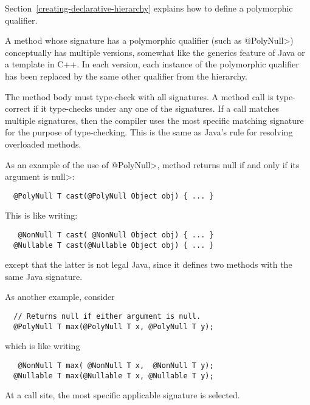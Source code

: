 Section~\ref{creating-declarative-hierarchy} explains how to define a
polymorphic qualifier.



A method whose signature has a polymorphic qualifier (such as \<@PolyNull>) conceptually has multiple
versions, somewhat like the generics feature of Java or a template in C++.
In each version, each instance of the polymorphic qualifier has been
replaced by the same other qualifier from the hierarchy.

The method body must type-check with all signatures.  A method call is
type-correct if it type-checks under any one of the signatures.  If a call
matches multiple signatures, then the compiler uses the most specific
matching signature for the purpose of type-checking.  This is the same as
Java's rule for resolving overloaded methods.


As an example of the use of \<@PolyNull>, method
returns null if and only if its argument is \<null>:

\begin{Verbatim}
  @PolyNull T cast(@PolyNull Object obj) { ... }
\end{Verbatim}

\noindent
This is like writing:

\begin{Verbatim}
   @NonNull T cast( @NonNull Object obj) { ... }
  @Nullable T cast(@Nullable Object obj) { ... }
\end{Verbatim}

\noindent
except that the latter is not legal Java, since it defines two
methods with the same Java signature.


As another example, consider

\begin{Verbatim}
  // Returns null if either argument is null.
  @PolyNull T max(@PolyNull T x, @PolyNull T y);
\end{Verbatim}

\noindent
which is like writing

\begin{Verbatim}
   @NonNull T max( @NonNull T x,  @NonNull T y);
  @Nullable T max(@Nullable T x, @Nullable T y);
\end{Verbatim}

\noindent
At a call site, the most specific applicable signature is selected.

